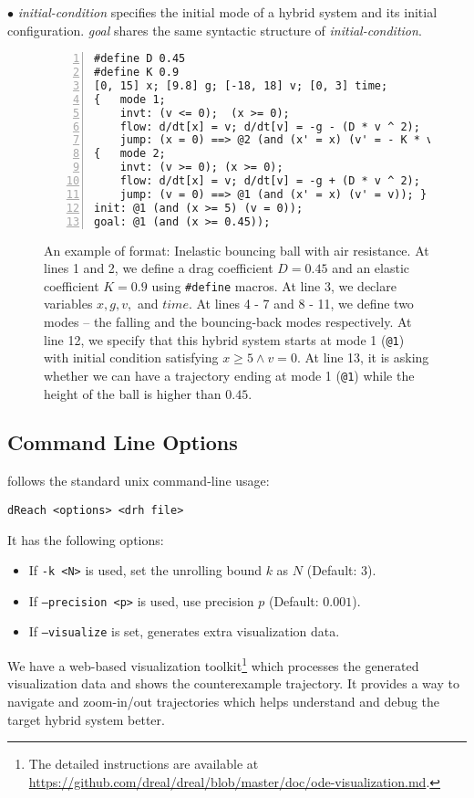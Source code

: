$\bullet$ \textit{initial-condition} specifies the initial mode of a hybrid
system and its initial configuration. \textit{goal} shares the same
syntactic structure of \textit{initial-condition}.
\begin{figure}
  \centering
  \begin{Verbatim}[fontfamily=courier, frame=single, framesep=1mm,
  numbers=left, fontsize=\scriptsize]
#define D 0.45
#define K 0.9
[0, 15] x; [9.8] g; [-18, 18] v; [0, 3] time;
{   mode 1;
    invt: (v <= 0);  (x >= 0);
    flow: d/dt[x] = v; d/dt[v] = -g - (D * v ^ 2);
    jump: (x = 0) ==> @2 (and (x' = x) (v' = - K * v)); }
{   mode 2;
    invt: (v >= 0); (x >= 0);
    flow: d/dt[x] = v; d/dt[v] = -g + (D * v ^ 2);
    jump: (v = 0) ==> @1 (and (x' = x) (v' = v)); }
init: @1 (and (x >= 5) (v = 0));
goal: @1 (and (x >= 0.45));
\end{Verbatim}
\caption{An example of \drh{} format: Inelastic bouncing ball with air
  resistance. At lines 1 and 2, we define a drag coefficient $D = 0.45$
  and an elastic coefficient $K = 0.9$ using \texttt{\#define} macros.
  At line 3, we declare variables $x, g, v,$ and $time$. At lines
  4 - 7 and 8 - 11, we define two modes -- the falling and the
  bouncing-back modes respectively. At line 12, we specify
  that this hybrid system starts at mode 1 (\texttt{@1}) with initial
  condition satisfying $x \ge 5 \land v = 0$. At line 13, it
  is asking whether we can have a trajectory ending at mode 1
  (\texttt{@1}) while the height of the ball is higher than $0.45$.}
\label{fig:bouncing-ball-drh}
\end{figure}

\subsection{Command Line Options}
\dReach{} follows the standard unix command-line usage:
\begin{Verbatim}[fontfamily=courier, framesep=1mm, fontsize=\small]
dReach <options> <drh file>
\end{Verbatim}
It has the following options:
\begin{itemize}
\item If \texttt{-k <N>} is used, set the unrolling bound $k$ as $N$ (Default: 3).
\item If \texttt{--precision <p>} is used, use precision $p$ (Default: $0.001$).
\item If \texttt{--visualize} is set, \dReach{} generates extra visualization data.
\end{itemize}
We have a web-based visualization toolkit\footnote{The detailed
  instructions are available at
  \url{https://github.com/dreal/dreal/blob/master/doc/ode-visualization.md}.}
which processes the generated visualization data and shows the
counterexample trajectory. It provides a way to navigate and
zoom-in/out trajectories which helps understand and debug the target
hybrid system better.

